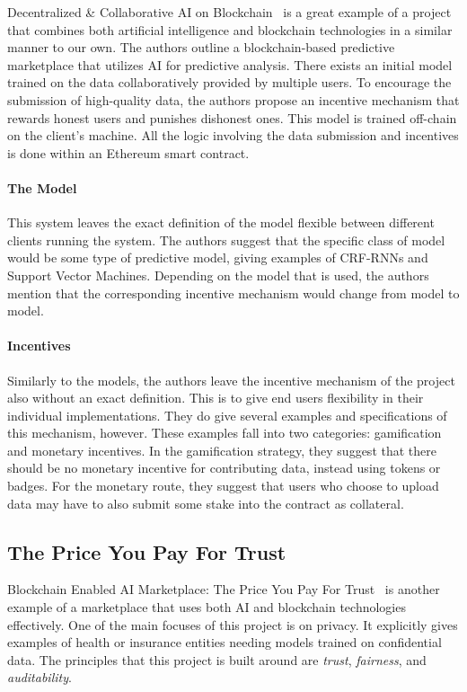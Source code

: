 \documentclass{ledger}
\begin{document}
Decentralized \& Collaborative AI on Blockchain~\cite{sharingModels} is a great example of a project that combines both
artificial intelligence and blockchain technologies in a similar manner to our own.  The authors outline a blockchain-based
predictive marketplace that utilizes AI for predictive analysis. There exists an initial model trained on the data
collaboratively provided by multiple users. To encourage the submission of high-quality data, the authors propose an
incentive mechanism that rewards honest users and punishes dishonest ones.  This model is trained off-chain on the client's
machine.  All the logic involving the data submission and incentives is done within an Ethereum smart contract.

\paragraph{The Model}
This system leaves the exact definition of the model flexible between different clients running the system.  The authors
suggest that the specific class of model would be some type of predictive model, giving examples of CRF-RNNs and Support
Vector Machines.  Depending on the model that is used, the authors mention that the corresponding incentive mechanism
would change from model to model.

\paragraph{Incentives}
Similarly to the models, the authors leave the incentive mechanism of the project also without an exact definition.
This is to give end users flexibility in their individual implementations.  They do give several examples and specifications
of this mechanism, however.  These examples fall into two categories: gamification and monetary incentives.  In the
gamification strategy, they suggest that there should be no monetary incentive for contributing data, instead using
tokens or badges.  For the monetary route, they suggest that users who choose to upload data may have to also submit
some stake into the contract as collateral.

\subsection{The Price You Pay For Trust}

Blockchain Enabled AI Marketplace: The Price You Pay For Trust~\cite{priceOfTrust} is another example of a marketplace
that uses both AI and blockchain technologies effectively.  One of the main focuses of this project is on privacy. It
explicitly gives examples of health or insurance entities needing models trained on confidential data.  The principles
that this project is built around are \textit{trust}, \textit{fairness}, and \textit{auditability}.
\end{document}
